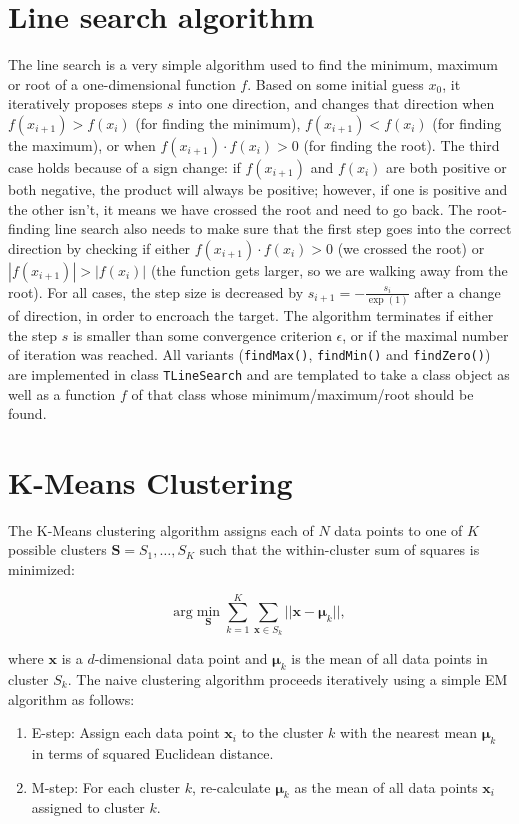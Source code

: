 \documentclass[a4paper,11pt]{article}
\def\x{\boldsymbol{x}}
\def\bmu{\boldsymbol{\mu}}
\newcommand{\class}[1]{\texttt{#1}}
\newcommand{\pubfunc}[1]{\texttt{#1()}}
\begin{document}
\section{Line search algorithm}
The line search is a very simple algorithm used to find the minimum, maximum or root of a one-dimensional function $f$. Based on some initial guess $x_0$, it iteratively proposes steps $s$ into one direction, and changes that direction when $f(x_{i+1}) > f(x_i)$ (for finding the minimum), $f(x_{i+1}) < f(x_i)$ (for finding the maximum), or when $f(x_{i+1}) \cdot f(x_i) > 0$ (for finding the root). The third case holds because of a sign change: if $f(x_{i+1})$ and $f(x_i)$ are both positive or both negative, the product will always be positive; however, if one is positive and the other isn't, it means we have crossed the root and need to go back. The root-finding line search also needs to make sure that the first step goes into the correct direction by checking if either $f(x_{i+1}) \cdot f(x_i) > 0$ (we crossed the root) or $|f(x_{i+1})| > |f(x_i)|$ (the function gets larger, so we are walking away from the root). For all cases, the step size is decreased by $s_{i+1} = -\frac{s_i}{\exp(1)}$ after a change of direction, in order to encroach the target. The algorithm terminates if either the step $s$ is smaller than some convergence criterion $\epsilon$, or if the maximal number of iteration was reached. All variants (\pubfunc{findMax}, \pubfunc{findMin} and \pubfunc{findZero}) are implemented in class \class{TLineSearch} and are templated to take a class object as well as a function $f$ of that class whose minimum/maximum/root should be found.


\section{K-Means Clustering}
The K-Means clustering algorithm assigns each of $N$ data points to one of $K$ possible clusters $\boldsymbol{S} = S_1, \ldots, S_K$ such that the within-cluster sum of squares is minimized:

\begin{equation*}
 \mbox{arg}\min_{\boldsymbol{S}} \sum_{k=1}^K \sum_{\x \in S_k} ||\x - \bmu_k||,
\end{equation*}

where $\x$ is a $d$-dimensional data point and $\bmu_k$ is the mean of all data points in cluster $S_k$. The naive clustering algorithm proceeds iteratively using a simple EM algorithm as follows:
\begin{enumerate}
 \item E-step: Assign each data point $\x_i$ to the cluster $k$ with the nearest mean $\bmu_k$ in terms of squared Euclidean distance.
 \item M-step: For each cluster $k$, re-calculate $\bmu_k$ as the mean of all data points $\x_i$ assigned to cluster $k$.
\end{enumerate}
\end{document}
